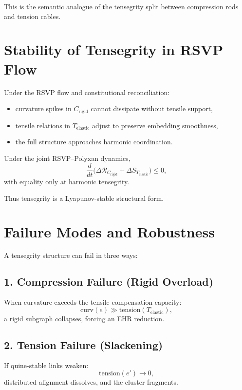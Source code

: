 This is the semantic analogue of the tensegrity split between compression rods and tension cables.


\section{Stability of Tensegrity in RSVP Flow}

Under the RSVP flow and constitutional reconciliation:

\begin{itemize}
    \item curvature spikes in $C_{\mathrm{rigid}}$ cannot dissipate without tensile support,
    \item tensile relations in $T_{\mathrm{elastic}}$ adjust to preserve embedding smoothness,
    \item the full structure approaches harmonic coordination.
\end{itemize}

\begin{theorem}
Under the joint RSVP–Polyxan dynamics,
\[
\frac{d}{dt}\bigl(
\Delta\mathcal{R}_{C_{\mathrm{rigid}}}
+
\Delta S_{T_{\mathrm{elastic}}}
\bigr)
\le 0,
\]
with equality only at harmonic tensegrity.
\end{theorem}

Thus tensegrity is a Lyapunov-stable structural form.


\section{Failure Modes and Robustness}

A tensegrity structure can fail in three ways:

\subsection{1. Compression Failure (Rigid Overload)}

When curvature exceeds the tensile compensation capacity:
\[
\mathrm{curv}(e) \gg \mathrm{tension}(T_{\mathrm{elastic}}),
\]
a rigid subgraph collapses, forcing an EHR reduction.

\subsection{2. Tension Failure (Slackening)}

If quine-stable links weaken:
\[
\mathrm{tension}(e') \to 0,
\]
distributed alignment dissolves, and the cluster fragments.

